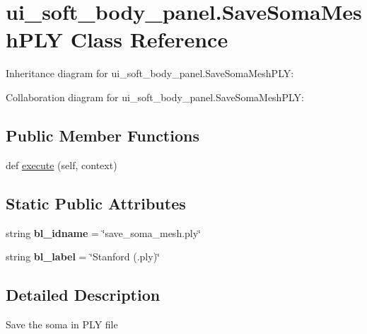 \hypertarget{classui__soft__body__panel_1_1SaveSomaMeshPLY}{}\section{ui\+\_\+soft\+\_\+body\+\_\+panel.\+Save\+Soma\+Mesh\+P\+LY Class Reference}
\label{classui__soft__body__panel_1_1SaveSomaMeshPLY}


Inheritance diagram for ui\+\_\+soft\+\_\+body\+\_\+panel.\+Save\+Soma\+Mesh\+P\+LY\+:


Collaboration diagram for ui\+\_\+soft\+\_\+body\+\_\+panel.\+Save\+Soma\+Mesh\+P\+LY\+:
\subsection*{Public Member Functions}
\begin{DoxyCompactItemize}
\item 
def \hyperlink{classui__soft__body__panel_1_1SaveSomaMeshPLY_ae593b644915be685f812ae60687dd078}{execute} (self, context)
\end{DoxyCompactItemize}
\subsection*{Static Public Attributes}
\begin{DoxyCompactItemize}
\item 
string {\bfseries bl\+\_\+idname} = \char`\"{}save\+\_\+soma\+\_\+mesh.\+ply\char`\"{}\hypertarget{classui__soft__body__panel_1_1SaveSomaMeshPLY_a4f3165a0cd6a3b2211d5d5e018a98d58}{}\label{classui__soft__body__panel_1_1SaveSomaMeshPLY_a4f3165a0cd6a3b2211d5d5e018a98d58}

\item 
string {\bfseries bl\+\_\+label} = \char`\"{}Stanford (.ply)\char`\"{}\hypertarget{classui__soft__body__panel_1_1SaveSomaMeshPLY_aa608e4385713b9c5ce588ced0477c73f}{}\label{classui__soft__body__panel_1_1SaveSomaMeshPLY_aa608e4385713b9c5ce588ced0477c73f}

\end{DoxyCompactItemize}


\subsection{Detailed Description}
\begin{DoxyVerb}Save the soma in PLY file\end{DoxyVerb}
 


